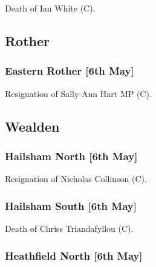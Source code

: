 \documentclass[a4paper,openany]{book}
\begin{document}
\begin{resultsiii}

Death of Ian White (C).

\subsection*{Rother}

\subsubsection*{Eastern Rother \hspace*{\fill}\nolinebreak[1]%
	\enspace\hspace*{\fill}
	[6th May]}


Resignation of Sally-Ann Hart MP (C).

\subsection*{Wealden}

\subsubsection*{Hailsham North \hspace*{\fill}\nolinebreak[1]%
	\enspace\hspace*{\fill}
	[6th May]}


Resignation of Nicholas Collinson (C).

\subsubsection*{Hailsham South \hspace*{\fill}\nolinebreak[1]%
	\enspace\hspace*{\fill}
	[6th May]}


Death of Chriss Triandafyllou (C).

\subsubsection*{Heathfield North \hspace*{\fill}\nolinebreak[1]%
	\enspace\hspace*{\fill}
	[6th May]}


\end{resultsiii}
\end{document}
